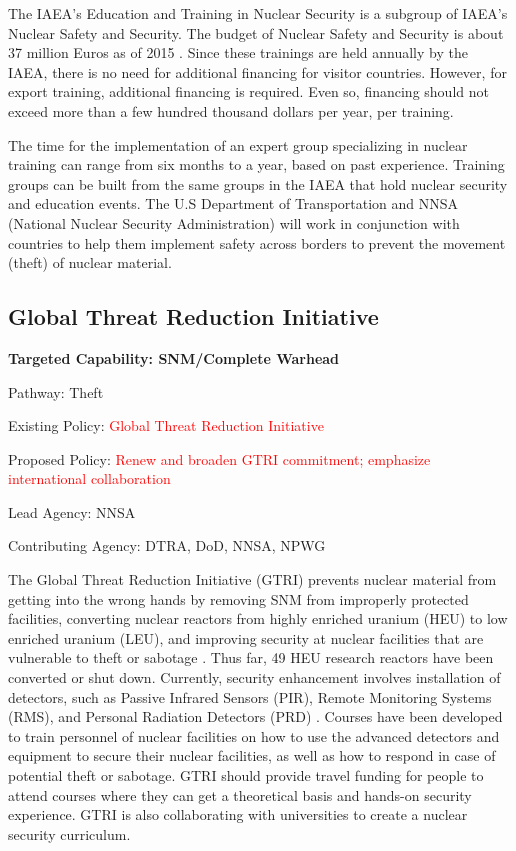 \documentclass{report}
\begin{document}

The IAEA's Education and Training in Nuclear Security is a subgroup of IAEA's Nuclear Safety and Security. The budget of  Nuclear Safety and Security is about 37 million Euros  as of 2015 \cite{Iaea2014}. Since these trainings are held annually by the IAEA, there is no need for additional financing for visitor countries. However, for export training, additional financing is required. Even so, financing should not exceed more than a few hundred thousand dollars per year, per training. 

The time for the implementation of an  expert group specializing in nuclear training can range from six months to a year, based on past experience.  Training groups can be built from the same groups in the IAEA that hold nuclear security and education events. The U.S Department of Transportation and NNSA (National Nuclear Security Administration) will work in conjunction with countries to help them implement safety across borders to prevent the movement (theft) of nuclear material. 




\subsection{Global Threat Reduction Initiative} \label{sec:GTRI}



\bfseries Targeted Capability: SNM/Complete Warhead

Pathway: Theft

Existing Policy:  \textcolor{red}{Global Threat Reduction Initiative}

Proposed Policy:  \textcolor{red}{Renew and broaden GTRI commitment; emphasize international  collaboration }

Lead Agency: NNSA


Contributing Agency: DTRA, DoD, NNSA, NPWG  \normalfont




The Global Threat Reduction Initiative (GTRI) prevents nuclear material from getting into the wrong hands by removing SNM from improperly protected facilities, converting nuclear  reactors from highly enriched uranium (HEU) to low enriched uranium (LEU), and improving security at nuclear facilities that are vulnerable to theft or sabotage \cite{NationalNuclearSecurityAdministration2014}. Thus far, 49 HEU research reactors have been converted or shut down. Currently, security enhancement involves installation of detectors, such as Passive Infrared Sensors (PIR), Remote Monitoring Systems (RMS), and Personal Radiation Detectors (PRD) \cite{NationalNuclearSecurityAdministrationa}. Courses have been developed to train personnel of nuclear facilities on how to use the advanced detectors and equipment to secure their nuclear facilities, as well as how to respond in case of potential theft or sabotage. GTRI should provide travel funding for people to attend courses where they can get a theoretical basis and hands-on security experience. GTRI is also collaborating with universities to create a nuclear security curriculum.
\end{document}
